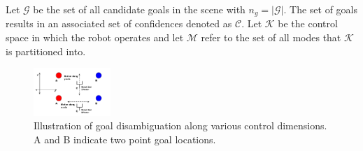 \documentclass[conference]{IEEEtran}
\begin{document}
Let $\mathcal{G}$ be the set of all candidate goals in the scene with $n_g = \vert\mathcal{G}\vert$.
The set of goals results in an associated set of confidences denoted as $\mathcal{C}$.
Let $\mathcal{K}$ be the control space in which the robot operates and  let $\mathcal{M}$ refer to the set of all modes that $\mathcal{K}$ is partitioned into.
\begin{figure}
	\vspace{-0.97cm}
	\includegraphics[width=0.26\textwidth]{./figures/DE.png}
	\vspace{-0.9cm}
	\caption{Illustration of goal disambiguation along various control dimensions. A and B indicate two point goal locations.}
	\label{DE}
\end{figure}

\end{document}
